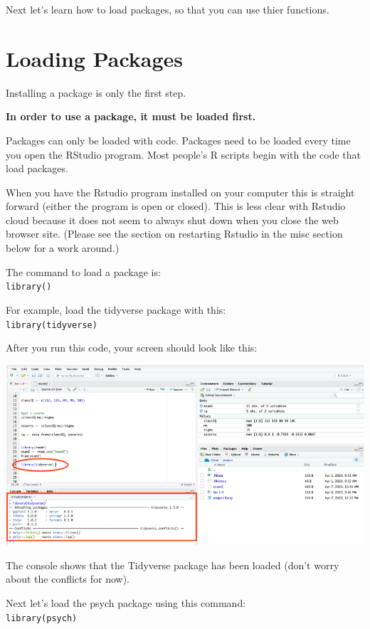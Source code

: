 \documentclass[
]{book}
\begin{document}
Next let's learn how to load packages, so that you can use thier functions.

\hypertarget{loading-packages}{%
\section{Loading Packages}\label{loading-packages}}

Installing a package is only the first step.

\textbf{In order to use a package, it must be loaded first.}

Packages can only be loaded with code. Packages need to be loaded every time you open the RStudio program. Most people's R scripts begin with the code that load packages.

When you have the Rstudio program installed on your computer this is straight forward (either the program is open or closed). This is less clear with Rstudio cloud because it does not seem to always shut down when you close the web browser site. (Please see the section on restarting Rstudio in the misc section below for a work around.)

The command to load a package is:\\
\texttt{library()}

For example, load the tidyverse package with this:\\
\texttt{library(tidyverse)}

After you run this code, your screen should look like this:

\includegraphics{img/loadtidy.png}

The console shows that the Tidyverse package has been loaded (don't worry about the conflicts for now).

Next let's load the psych package using this command:\\
\texttt{library(psych)}
\end{document}
